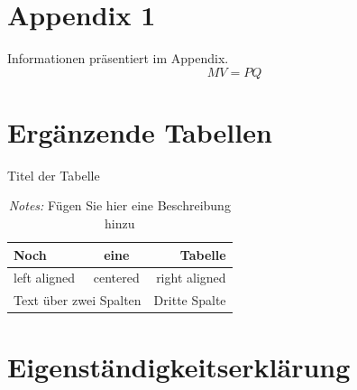 \documentclass[a4paper,12pt]{scrartcl} %
\begin{document}

\clearpage


  \label{sec:literatur}                                 %
\onehalfspacing


\printbibliography %



\clearpage
\appendix
{} %

\section{Appendix 1}

Informationen präsentiert im Appendix.
\begin{equation}
    MV=PQ
\end{equation}

\clearpage

\section{Ergänzende Tabellen}


\begin{table}[h!] %
\caption{Titel der Tabelle}
\label{tab:SuppTable1}
\centering
 \begin{tabular}{lcr}
   Noch & eine & Tabelle\\
\toprule
   left aligned & centered & right aligned \\
   \multicolumn{2}{c}{Text über zwei Spalten} & Dritte Spalte \\
\bottomrule
\end{tabular}
\caption*{\footnotesize{\emph{Notes:} Fügen Sie hier eine Beschreibung hinzu}}
\end{table}

\clearpage

\section{Eigenständigkeitserklärung}
\end{document}
